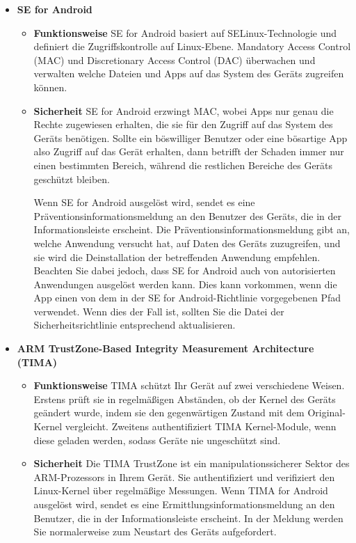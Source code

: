 \begin{itemize}
	\item \textbf{SE for Android}
	\begin{itemize}
		\item \textbf{Funktionsweise} \newline SE for Android basiert auf SELinux-Technologie und definiert die Zugriffskontrolle auf Linux-Ebene. Mandatory Access Control (MAC) und Discretionary Access Control (DAC) überwachen und verwalten welche Dateien und Apps auf das System des Geräts zugreifen können.
		\item \textbf{Sicherheit} \newline SE for Android erzwingt MAC, wobei Apps nur genau die Rechte zugewiesen erhalten, die sie für den Zugriff auf das System des Geräts benötigen. Sollte ein böswilliger Benutzer oder eine bösartige App also Zugriff auf das Gerät erhalten, dann betrifft der Schaden immer nur einen bestimmten Bereich, während die restlichen Bereiche des Geräts geschützt bleiben. \par Wenn SE for Android ausgelöst wird, sendet es eine Präventionsinformationsmeldung an den Benutzer des Geräts, die in der Informationsleiste erscheint. Die Präventionsinformationsmeldung gibt an, welche Anwendung versucht hat, auf Daten des Geräts zuzugreifen, und sie wird die Deinstallation der betreffenden Anwendung empfehlen. Beachten Sie dabei jedoch, dass SE for Android auch von autorisierten Anwendungen ausgelöst werden kann. Dies kann vorkommen, wenn die App einen von dem in der SE for Android-Richtlinie vorgegebenen Pfad verwendet. Wenn dies der Fall ist, sollten Sie die Datei der Sicherheitsrichtlinie entsprechend aktualisieren.
	\end{itemize}
	\item \textbf{ARM TrustZone-Based Integrity Measurement Architecture (TIMA)}
	\begin{itemize}
		\item \textbf{Funktionsweise} \newline TIMA schützt Ihr Gerät auf zwei verschiedene Weisen. Erstens prüft sie in regelmäßigen Abständen, ob der Kernel des Geräts geändert wurde, indem sie den gegenwärtigen Zustand mit dem Original-Kernel vergleicht. Zweitens authentifiziert TIMA Kernel-Module, wenn diese geladen werden, sodass Geräte nie ungeschützt sind.
		\item \textbf{Sicherheit} \newline Die TIMA TrustZone ist ein manipulationssicherer Sektor des ARM-Prozessors in Ihrem Gerät. Sie authentifiziert und verifiziert den Linux-Kernel über regelmäßige Messungen. Wenn TIMA for Android ausgelöst wird, sendet es eine Ermittlungsinformationsmeldung an den Benutzer, die in der Informationsleiste erscheint. In der Meldung werden Sie normalerweise zum Neustart des Geräts aufgefordert.

\end{itemize}
\end{itemize}

